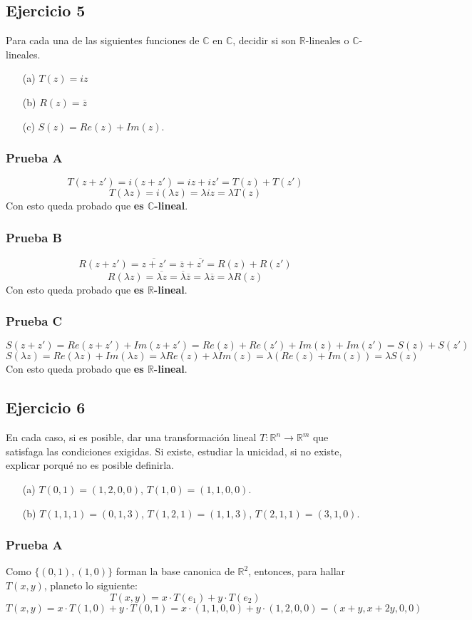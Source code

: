 \documentclass[a4paper,12pt]{article}
\begin{document}
\subsection{Ejercicio 5}
Para cada una de las siguientes funciones de $\mathbb{C}$ en $\mathbb{C}$, decidir si son $\mathds{R}$-lineales o $\mathbb{C}$-lineales.
\begin{itemize}
    \item[(a)] $T(z)=iz$
    \item[(b)] $R(z)=\overline{z}$
    \item[(c)] $S(z)= Re(z)+Im(z)$.  
\end{itemize}
\subsubsection{Prueba A}
$$
T(z+z')=i(z+z')=iz+iz'=T(z)+T(z')
$$
$$
T(\lambda z)=i(\lambda z)=\lambda iz=\lambda T(z)
$$
Con esto queda probado que \textbf{es $\mathbb{C}$-lineal}.
\subsubsection{Prueba B}
$$
R(z+z')=\overline{z+z'}=\overline{z}+\overline{z'}=R(z)+R(z')
$$
$$
R(\lambda z)=\overline{\lambda z}=\overline{\lambda}\overline{z}=\lambda\overline{z}=\lambda R(z)
$$
Con esto queda probado que \textbf{es $\mathds{R}$-lineal}.
\subsubsection{Prueba C}
$$
S(z+z')=Re(z+z')+Im(z+z')=Re(z)+Re(z')+Im(z)+Im(z')=S(z)+S(z')
$$
$$
S(\lambda z)=Re(\lambda z)+Im(\lambda z)=\lambda Re(z)+\lambda Im(z)=\lambda (Re(z)+Im(z))=\lambda S(z)
$$
Con esto queda probado que \textbf{es $\mathds{R}$-lineal}.
\subsection{Ejercicio 6}
En cada caso, si es posible, dar una transformación lineal $T:\mathds{R}^n\to \mathds{R}^m$ que satisfaga las condiciones exigidas. Si existe, estudiar la unicidad, si no existe, explicar porqué no es posible definirla.
\begin{itemize}
    \item[(a)] $T(0,1)=(1,2,0,0)$, $T(1,0)= (1,1,0,0)$.
    \item[(b)] $T(1,1,1)=(0,1,3)$, $T(1,2,1)=(1,1,3)$, $T(2,1,1)=(3,1,0)$.
\end{itemize}
\subsubsection{Prueba A}
Como $\{ (0,1), (1,0) \}$ forman la base canonica de $\mathds{R}^2$, entonces, para hallar $T(x,y)$, planeto lo siguiente:
$$
T(x,y) = x\cdot T(e_1) + y\cdot T(e_2)
$$
$$
T(x,y)= x\cdot T(1,0) + y\cdot T(0,1) = x\cdot (1,1,0,0) + y\cdot (1,2,0,0) = (x+y, x+2y, 0, 0)
$$
\end{document}
